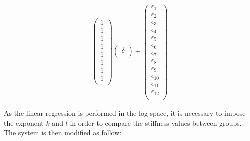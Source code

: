 \documentclass[a4paper,fleqn]{DC_ArtStyle}
\begin{document}
\begin{equation}
\begin{split}
\begin{pmatrix}
		1 \\
		1 \\
		1 \\
		1 \\
		1 \\
		1 \\
		1 \\
		1 \\
	\end{pmatrix}\begin{pmatrix}
	\delta \\
	\end{pmatrix} + \begin{pmatrix}
		\epsilon_{1} \\
		\epsilon_{2} \\
		\epsilon_{3} \\
		\epsilon_{4} \\
		\epsilon_{5} \\
		\epsilon_{6} \\
		\epsilon_{7} \\
		\epsilon_{8} \\
		\epsilon_{9} \\
		\epsilon_{10} \\
		\epsilon_{11} \\
		\epsilon_{12} \\
	\end{pmatrix}
	\end{split}
\end{equation}

As the linear regression is performed in the log space, it is necessary to impose the exponent $k$ and $l$ in order to compare the stiffness values between groups. The system is then modified as follow:
\end{document}
